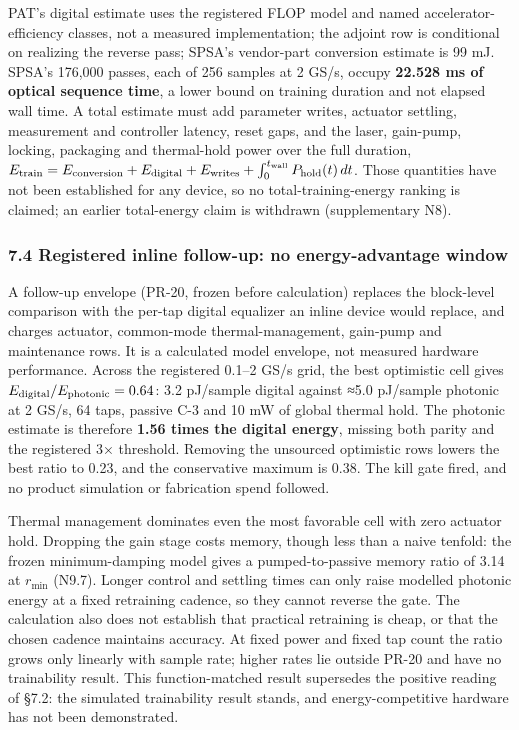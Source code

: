 \documentclass[
  10pt,
]{article}
\begin{document}
PAT's digital estimate uses the registered FLOP model and named
accelerator-efficiency classes, not a measured implementation; the
adjoint row is conditional on realizing the reverse pass; SPSA's
vendor-part conversion estimate is 99 mJ. SPSA's 176,000 passes, each of
256 samples at 2 GS/s, occupy \textbf{22.528 ms of optical sequence
time}, a lower bound on training duration and not elapsed wall time. A
total estimate must add parameter writes, actuator settling, measurement
and controller latency, reset gaps, and the laser, gain-pump, locking,
packaging and thermal-hold power over the full duration,
\(E_{\rm train}=E_{\rm conversion}+E_{\rm digital}+E_{\rm writes}
+\int_0^{t_{\rm wall}}P_{\rm hold}(t)\,dt\). Those quantities have not
been established for any device, so no total-training-energy ranking is
claimed; an earlier total-energy claim is withdrawn (supplementary N8).

\subsubsection{7.4 Registered inline follow-up: no energy-advantage
window}\label{registered-inline-follow-up-no-energy-advantage-window}

A follow-up envelope (PR-20, frozen before calculation) replaces the
block-level comparison with the per-tap digital equalizer an inline
device would replace, and charges actuator, common-mode
thermal-management, gain-pump and maintenance rows. It is a calculated
model envelope, not measured hardware performance. Across the registered
0.1--2 GS/s grid, the best optimistic cell gives
\(E_{\rm digital}/E_{\rm photonic}=0.64\): 3.2 pJ/sample digital against
≈5.0 pJ/sample photonic at 2 GS/s, 64 taps, passive C-3 and 10 mW of
global thermal hold. The photonic estimate is therefore \textbf{1.56
times the digital energy}, missing both parity and the registered 3×
threshold. Removing the unsourced optimistic rows lowers the best ratio
to 0.23, and the conservative maximum is 0.38. The kill gate fired, and
no product simulation or fabrication spend followed.

Thermal management dominates even the most favorable cell with zero
actuator hold. Dropping the gain stage costs memory, though less than a
naive tenfold: the frozen minimum-damping model gives a
pumped-to-passive memory ratio of 3.14 at \(r_\text{min}\) (N9.7).
Longer control and settling times can only raise modelled photonic
energy at a fixed retraining cadence, so they cannot reverse the gate.
The calculation also does not establish that practical retraining is
cheap, or that the chosen cadence maintains accuracy. At fixed power and
fixed tap count the ratio grows only linearly with sample rate; higher
rates lie outside PR-20 and have no trainability result. This
function-matched result supersedes the positive reading of §7.2: the
simulated trainability result stands, and energy-competitive hardware
has not been demonstrated.
\end{document}
